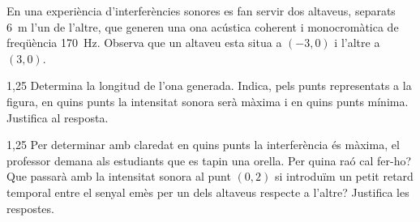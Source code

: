En una experiència d'interferències sonores es fan servir dos altaveus, separats 6~m l'un de l'altre, que generen una ona acústica coherent i monocromàtica de freqüència 170~Hz. Observa que un altaveu esta situa a $(-3, 0)$ i l'altre a $(3,0)$.


\begin{apartat}{1,25}
Determina la longitud de l'ona generada. Indica, pels punts representats a la figura, en quins punts la intensitat sonora serà màxima i en quins punts mínima. Justifica al resposta.
\end{apartat}

\begin{apartat}{1,25}
Per determinar amb claredat en quins punts la interferència és màxima, el professor demana als estudiants que es tapin una orella. Per quina raó cal fer-ho? Que passarà amb la intensitat sonora al punt $(0,2)$ si introduïm un petit retard temporal entre el senyal emès per un dels altaveus respecte a l'altre? Justifica les respostes.
\end{apartat}

